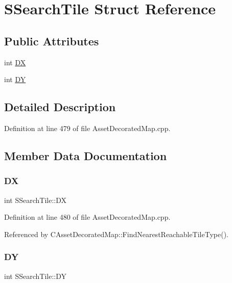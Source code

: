 \hypertarget{structSSearchTile}{}\section{S\+Search\+Tile Struct Reference}
\label{structSSearchTile}
\subsection*{Public Attributes}
\begin{DoxyCompactItemize}
\item 
int \hyperlink{structSSearchTile_a08045e94e80c5c6e98f23313139853c6}{DX}
\item 
int \hyperlink{structSSearchTile_a5a7b0a0b5d8efc7a01175625a012abd1}{DY}
\end{DoxyCompactItemize}


\subsection{Detailed Description}


Definition at line 479 of file Asset\+Decorated\+Map.\+cpp.



\subsection{Member Data Documentation}
\hypertarget{structSSearchTile_a08045e94e80c5c6e98f23313139853c6}{}\label{structSSearchTile_a08045e94e80c5c6e98f23313139853c6} 
\subsubsection{\texorpdfstring{DX}{DX}}
{\footnotesize\ttfamily int S\+Search\+Tile\+::\+DX}



Definition at line 480 of file Asset\+Decorated\+Map.\+cpp.



Referenced by C\+Asset\+Decorated\+Map\+::\+Find\+Nearest\+Reachable\+Tile\+Type().

\hypertarget{structSSearchTile_a5a7b0a0b5d8efc7a01175625a012abd1}{}\label{structSSearchTile_a5a7b0a0b5d8efc7a01175625a012abd1} 
\subsubsection{\texorpdfstring{DY}{DY}}
{\footnotesize\ttfamily int S\+Search\+Tile\+::\+DY}



